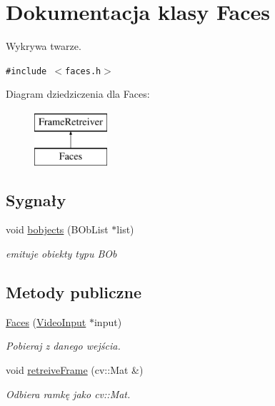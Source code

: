 \hypertarget{class_faces}{
\section{Dokumentacja klasy Faces}
\label{class_faces}
}
Wykrywa twarze.  


{\tt \#include $<$faces.h$>$}

Diagram dziedziczenia dla Faces:\begin{figure}[H]
\begin{center}
\leavevmode
\includegraphics[height=2cm]{class_faces}
\end{center}
\end{figure}
\subsection*{Sygnały}
\begin{CompactItemize}
\item 
\hypertarget{class_faces_92e42ecfad99d9e0766b569b562b86ba}{
void \hyperlink{class_faces_92e42ecfad99d9e0766b569b562b86ba}{bobjects} (BObList $\ast$list)}
\label{class_faces_92e42ecfad99d9e0766b569b562b86ba}

\begin{CompactList}\small\item\em emituje obiekty typu BOb \item\end{CompactList}\end{CompactItemize}
\subsection*{Metody publiczne}
\begin{CompactItemize}
\item 
\hypertarget{class_faces_65ba31b6180506d6815f773365883a80}{
\hyperlink{class_faces_65ba31b6180506d6815f773365883a80}{Faces} (\hyperlink{class_video_input}{VideoInput} $\ast$input)}
\label{class_faces_65ba31b6180506d6815f773365883a80}

\begin{CompactList}\small\item\em Pobieraj z danego wejścia. \item\end{CompactList}\item 
void \hyperlink{class_faces_7fd92e73e117b72898097551b964fd96}{retreiveFrame} (cv::Mat \&)
\begin{CompactList}\small\item\em Odbiera ramkę jako cv::Mat. \item\end{CompactList}\end{CompactItemize}


